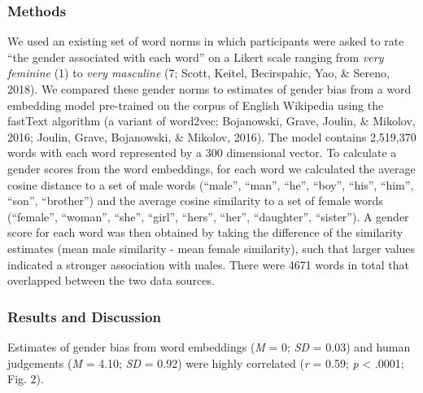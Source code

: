 \documentclass[man,floatsintext]{apa6}
\theoremstyle{definition}
\theoremstyle{definition}
\theoremstyle{definition}
\theoremstyle{remark}
\begin{document}
\subsubsection{Methods}\label{methods}

We used an existing set of word norms in which participants were asked
to rate \enquote{the gender associated with each word} on a Likert scale
ranging from \emph{very feminine} (1) to \emph{very masculine} (7;
Scott, Keitel, Becirspahic, Yao, \& Sereno, 2018). We compared these
gender norms to estimates of gender bias from a word embedding model
pre-trained on the corpus of English Wikipedia using the fastText
algorithm (a variant of word2vec; Bojanowski, Grave, Joulin, \& Mikolov,
2016; Joulin, Grave, Bojanowski, \& Mikolov, 2016). The model contains
2,519,370 words with each word represented by a 300 dimensional vector.
To calculate a gender scores from the word embeddings, for each word we
calculated the average cosine distance to a set of male words
(\enquote{male}, \enquote{man}, \enquote{he}, \enquote{boy},
\enquote{his}, \enquote{him}, \enquote{son}, \enquote{brother}) and the
average cosine similarity to a set of female words (\enquote{female},
\enquote{woman}, \enquote{she}, \enquote{girl}, \enquote{hers},
\enquote{her}, \enquote{daughter}, \enquote{sister}). A gender score for
each word was then obtained by taking the difference of the similarity
estimates (mean male similarity - mean female similarity), such that
larger values indicated a stronger association with males. There were
4671 words in total that overlapped between the two data sources.

\subsubsection{Results and Discussion}\label{results-and-discussion}

Estimates of gender bias from word embeddings (\emph{M} = 0; \emph{SD} =
0.03) and human judgements (\emph{M} = 4.10; \emph{SD} = 0.92) were
highly correlated (\emph{r} = 0.59; \emph{p} \textless{} .0001; Fig. 2).
\end{document}
